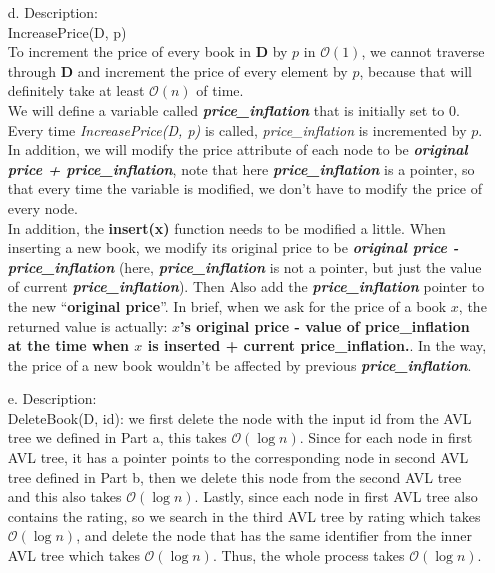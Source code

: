 \documentclass[10pt]{article}
\begin{document}
\begin{enumerate}
\item[d.] Description:\\
IncreasePrice(D, p)\\
To increment the price of every book in \textbf{D} by $p$ in $\mathcal{O}(1)$, we cannot traverse through \textbf{D} and increment the price of every element by $p$, because that will definitely take at least $\mathcal{O}(n)$ of time.\\
We will define a variable called \textbf{\textit{price\_inflation}} that is initially set to 0.\\
Every time \textit{IncreasePrice(D, p)} is called, \textit{price\_inflation} is incremented by $p$.\\
In addition, we will modify the price attribute of each node to be \textbf{\textit{original price + price\_inflation}},
note that here \textbf{\textit{price\_inflation}} is a pointer, so that every time the variable is modified, we don't have to modify the price of every node.\\
In addition, the \textbf{insert(x)} function needs to be modified a little. When inserting a new book, we modify its original price to be \textit{\textbf{original price - price\_inflation}} (here, \textit{\textbf{price\_inflation}} is not a pointer, but just the value of current \textit{\textbf{price\_inflation}}). Then Also add the \textbf{\textit{price\_inflation}} pointer to the new ``\textbf{original price}''. In brief, when we ask for the price of a book $x$, the returned value is actually: \textbf{$x$'s original price - value of price\_inflation at the time when $x$ is inserted + current price\_inflation.}. In the way, the price of a new book wouldn't be affected by previous \textit{\textbf{price\_inflation}}.

\item[e.]Description:\\
DeleteBook(D, id): we first delete the node with the input id from the AVL tree we defined in Part a, this takes $\mathcal{O}(\log n)$. Since for each node in first AVL tree, it has a pointer points to the corresponding node in second AVL tree defined in Part b, then we delete this node from the second AVL tree and this also takes $\mathcal{O}(\log n)$. Lastly, since each node in first AVL tree also contains the rating, so we search in the third AVL tree by rating which takes $\mathcal{O}(\log n)$, and delete the node that has the same identifier from the inner AVL tree which takes $\mathcal{O}(\log n)$. Thus, the whole process takes $\mathcal{O}(\log n)$.


\end{enumerate}
\end{document}
